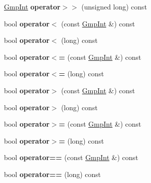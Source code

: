 \begin{DoxyCompactItemize}
\mbox{\label{class_gmp_int_a1bc1a03df2dcde64b96aa0cee7bca642}} 
\hyperlink{class_gmp_int}{Gmp\+Int} {\bfseries operator$>$$>$} (unsigned long) const
\item 
\mbox{\label{class_gmp_int_a2d8f111fd0545fa966a87052656aad50}} 
bool {\bfseries operator$<$} (const \hyperlink{class_gmp_int}{Gmp\+Int} \&) const
\item 
\mbox{\label{class_gmp_int_a02c05a80980e0070957ad2afe94271b1}} 
bool {\bfseries operator$<$} (long) const
\item 
\mbox{\label{class_gmp_int_a9ff21cbfa7e02fd55e5695ae17c9cf1f}} 
bool {\bfseries operator$<$=} (const \hyperlink{class_gmp_int}{Gmp\+Int} \&) const
\item 
\mbox{\label{class_gmp_int_a6049c67e480aecf414a28125a9ce3257}} 
bool {\bfseries operator$<$=} (long) const
\item 
\mbox{\label{class_gmp_int_aef2b82e000e75f177302f3ae7835d9b8}} 
bool {\bfseries operator$>$} (const \hyperlink{class_gmp_int}{Gmp\+Int} \&) const
\item 
\mbox{\label{class_gmp_int_ab1826d58b6369760298d0a35b6757081}} 
bool {\bfseries operator$>$} (long) const
\item 
\mbox{\label{class_gmp_int_a09ecc7acd157cbcd011a83c901051094}} 
bool {\bfseries operator$>$=} (const \hyperlink{class_gmp_int}{Gmp\+Int} \&) const
\item 
\mbox{\label{class_gmp_int_a5e24d17de3ee02e17c1ce9abcd094d65}} 
bool {\bfseries operator$>$=} (long) const
\item 
\mbox{\label{class_gmp_int_aff1fdbede44b450b1ec3c2fe8d17f15b}} 
bool {\bfseries operator==} (const \hyperlink{class_gmp_int}{Gmp\+Int} \&) const
\item 
\mbox{\label{class_gmp_int_a1da3b4c309a1ff532a1e34110311e243}} 
bool {\bfseries operator==} (long) const
\item 
\mbox{\label{class_gmp_int_a780da3bcc1e73c203fb95299dda3ee6d}} 

\end{DoxyCompactItemize}
